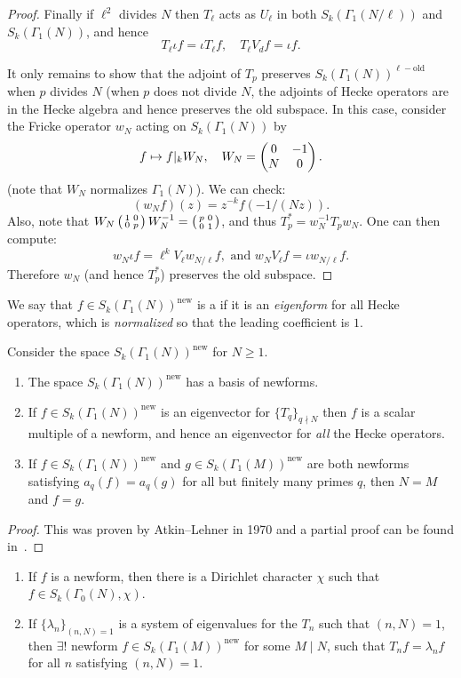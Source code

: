 \begin{proof}
Finally if $\ell^2$ divides $N$ then $T_\ell$ acts as $U_\ell$ in both $S_k(\Gamma_1(N/\ell))$ and $S_k(\Gamma_1(N))$, and hence
\[
T_\ell \iota f = \iota T_\ell f,\quad T_\ell V_d f = \iota f.
\]

It only remains to show that the adjoint of $T_p$ preserves $S_k(\Gamma_1(N))^{\ell-\text{old}}$ when $p$ divides $N$ (when $p$ does not divide $N$, the adjoints of Hecke operators are in the Hecke algebra and hence preserves the old subspace. In this case, consider the Fricke operator $w_N$ acting on $S_k(\Gamma_1(N))$ by
\[
f\mapsto f|_k W_N,\quad W_N=\left(\begin{matrix}0&-1\\N&0\end{matrix}\right).
\]
(note that $W_N$ normalizes $\Gamma_1(N)$). We can check:
\[
(w_N f)(z) = z^{-k}f(-1/(Nz)).
\]
Also, note that $W_N\left(\begin{smallmatrix}1&0\\0&p\end{smallmatrix}\right) W_N^{-1} = \left(\begin{smallmatrix}p&0\\0&1\end{smallmatrix}\right)$, and thus $T_p^* = w_N^{-1} T_p w_N$. One can then compute:
\[
w_N\iota f = \ell^k V_\ell w_{N/\ell} f,\text{ and } w_N V_\ell f = \iota w_{N/\ell} f.
\]
Therefore $w_N$ (and hence $T_p^*$) preserves the old subspace.
\end{proof}

We say that $f\in S_k(\Gamma_1(N))^\text{new}$ is a  if it is an \emph{eigenform} for all Hecke operators, which is \emph{normalized} so that the leading coefficient is $1$.
\begin{theorem}
Consider the space $S_k(\Gamma_1(N))^\text{new}$ for $N\geq 1$.
  \begin{enumerate}
  \item The space $S_k(\Gamma_1(N))^\text{new}$ has a basis of newforms.
  \item If $f\in S_k(\Gamma_1(N))^\text{new}$ is an eigenvector for $\{T_q\}_{q\nmid N}$ then $f$ is a scalar multiple of a newform, and hence an eigenvector for \emph{all} the Hecke operators.
  \item If  $f\in S_k(\Gamma_1(N))^\text{new}$ and $g\in S_k(\Gamma_1(M))^\text{new}$ are both newforms satisfying $a_q(f)=a_q(g)$ for all but finitely many primes $q$, then $N=M$ and $f=g$.
  \end{enumerate}
\end{theorem}
\begin{proof}
  This  was proven by Atkin--Lehner in 1970 and a partial proof can be found in~\cite{diamond-shurman}.
\end{proof}

\begin{corollary}
\label{cor:atkinlehner}
  \begin{enumerate}
  \item   If $f$ is a newform, then there is a Dirichlet character $\chi$ such that $f\in S_k(\Gamma_0(N),\chi)$.
\item If $\{\lambda_n\}_{(n,N)=1}$ is a system of eigenvalues for the $T_n$ such that $(n,N)=1$, then $\exists !$ newform $f\in S_k(\Gamma_1(M))^\text{new}$ for some $M\mid N$, such that $T_nf = \lambda_n f$ for all $n$ satisfying $(n,N)=1$.
  \end{enumerate}
\end{corollary}

